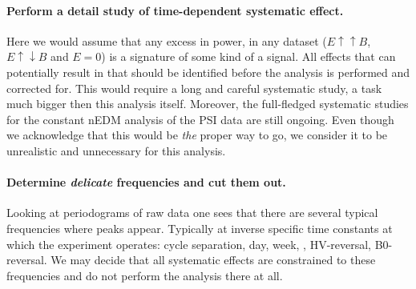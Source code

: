 \paragraph{Perform a detail study of time-dependent systematic effect.}
Here we would assume that any excess in power, in any dataset ($E \uparrow \uparrow B$, $E \uparrow \downarrow B$ and $E=0$) is a signature of some kind of a signal. All effects that can potentially result in that should be identified before the analysis is performed and corrected for. This would require a long and careful systematic study, a task much bigger then this analysis itself. Moreover, the full-fledged systematic studies for the constant nEDM analysis of the PSI data are still ongoing. Even though we acknowledge that this would be \emph{the} proper way to go, we consider it to be unrealistic and unnecessary for this analysis.

\paragraph{Determine \emph{delicate} frequencies and cut them out.}
Looking at periodograms of raw data one sees that there are several typical frequencies where peaks appear. Typically at inverse specific time constants at which the experiment operates: cycle separation, day, week, , HV-reversal, B0-reversal. We may decide that all systematic effects are constrained to these frequencies and do not perform the analysis there at all.

